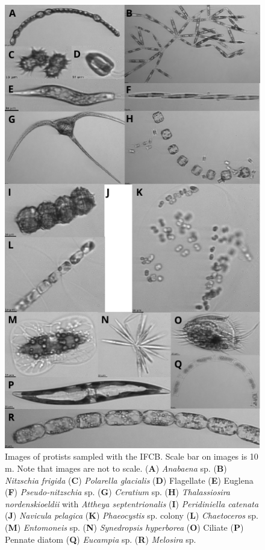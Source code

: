 \documentclass[essd, manuscript]{copernicus}
\begin{document}
\begin{figure}[H]
	\centering
	\includegraphics[scale = 1]{../../../graphs/fig12.pdf}
	\caption{Images of protists sampled with the IFCB. Scale bar on images is 10 \textmu m. Note that images are not to scale. (\textbf{A}) \textit{Anabaena} sp. (\textbf{B}) \textit{Nitzschia frigida} (\textbf{C}) \textit{Polarella glacialis} (\textbf{D}) Flagellate (\textbf{E}) Euglena (\textbf{F}) \textit{Pseudo-nitzschia} sp. (\textbf{G}) \textit{Ceratium} sp. (\textbf{H}) \textit{Thalassiosira nordenskioeldii} with \textit{Attheya septentrionalis} (\textbf{I}) \textit{Peridiniella catenata} (\textbf{J}) \textit{Navicula pelagica} (\textbf{K}) \textit{Phaeocystis} sp. colony (\textbf{L}) \textit{Chaetoceros} sp. (\textbf{M}) \textit{Entomoneis} sp. (\textbf{N}) \textit{Synedropsis hyperborea} (\textbf{O}) Ciliate (\textbf{P}) Pennate diatom (\textbf{Q}) \textit{Eucampia} sp. (\textbf{R}) \textit{Melosira} sp.}
\end{figure}
\end{document}
